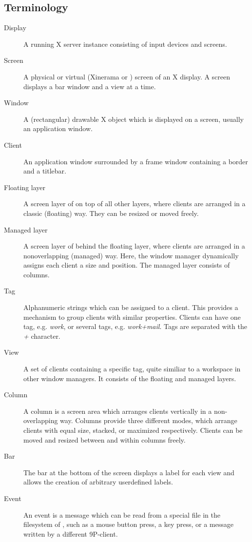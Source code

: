 \subsection{Terminology}

\begin{description}
\item[Display] A running X server instance consisting of input
	devices and screens.
\item[Screen] A physical or virtual (Xinerama or )
	screen of an X display. A screen displays a bar window
	and a view at a time.
\item[Window] A (rectangular) drawable X object which is
	displayed on a screen, usually an application window.
\item[Client] An application window surrounded by a frame window
	containing a border and a titlebar.
\item[Floating layer] A screen layer of  on top of
	all other layers, where clients are arranged in a
	classic (floating) way.  They can be resized or moved
	freely.
\item[Managed layer] A screen layer of  behind the
	floating layer, where clients are arranged in a
	non\-overlapping (managed) way.  Here, the window
	manager dynamically assigns each client a size and
	position.  The managed layer consists of columns.
\item[Tag] Alphanumeric strings which can be assigned to a
	client. This provides a mechanism to group clients with
	similar properties. Clients can have one tag, e.g.
	\emph{work}, or several tags, e.g.  \emph{work+mail}.
	Tags are separated with the \emph{+} character.
\item[View] A set of clients containing a specific tag, quite
	similiar to a workspace in other window managers.  It
	consists of the floating and managed layers.
\item[Column] A column is a screen area which arranges clients
	vertically in a non-overlapping way. Columns provide
	three different modes, which arrange clients with equal
	size, stacked, or maximized respectively.  Clients can
	be moved and resized between and within columns freely.
\item[Bar] The bar at the bottom of the screen displays a label
	for each view and allows the creation of arbitrary
	user\-defined labels.
\item[Event] An event is a message which can be read from a
	special file in the filesystem of , such as a
	mouse button press, a key press, or a message written by
	a different 9P-client.
\end{description}

